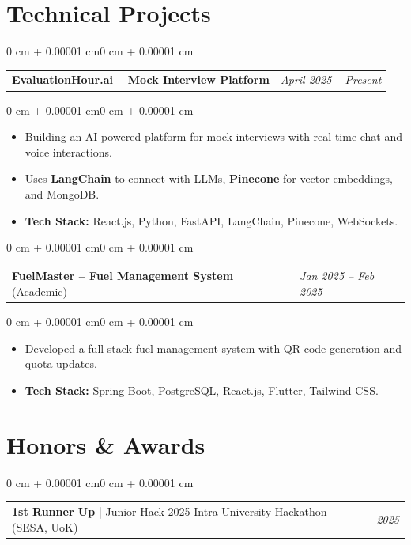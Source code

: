 \documentclass[10pt, letterpaper]{article}
\makeatletter
\newenvironment{highlights}{
    \begin{itemize}[
        topsep=0.10 cm,
        parsep=0.10 cm,
        partopsep=0pt,
        itemsep=0pt,
        leftmargin=0 cm + 10pt
    ]
}{
    \end{itemize}
}
\newenvironment{onecolentry}{
    \begin{adjustwidth}{0 cm + 0.00001 cm}{0 cm + 0.00001 cm}
}{
    \end{adjustwidth}
}
\newenvironment{twocolentry}{
    \begin{onecolentry}
    \begin{tabular}{@{}p{\dimexpr\textwidth-4.5cm\relax}>{\raggedleft\arraybackslash}p{4.5cm}@{}}
}{
    \end{tabular}
    \end{onecolentry}
}
\newcommand{\twocolitem}[2]{#1 & \textit{#2} \\}
\makeatother
\begin{document}
\section{Technical Projects}

\begin{twocolentry}
\twocolitem{\textbf{EvaluationHour.ai -- Mock Interview Platform}}{April 2025 -- Present}
\end{twocolentry}

\vspace{0.08 cm}
\begin{onecolentry}
    \begin{highlights}
        \item Building an AI-powered platform for mock interviews with real-time chat and voice interactions.
        \item Uses \textbf{LangChain} to connect with LLMs, \textbf{Pinecone} for vector embeddings, and MongoDB.
        \item \textbf{Tech Stack:} React.js, Python, FastAPI, LangChain, Pinecone, WebSockets.
    \end{highlights}
\end{onecolentry}

\vspace{0.18 cm}

\begin{twocolentry}
\twocolitem{\textbf{FuelMaster -- Fuel Management System} (Academic)}{Jan 2025 -- Feb 2025}
\end{twocolentry}

\vspace{0.08 cm}
\begin{onecolentry}
    \begin{highlights}
        \item Developed a full-stack fuel management system with QR code generation and quota updates.
        \item \textbf{Tech Stack:} Spring Boot, PostgreSQL, React.js, Flutter, Tailwind CSS.
    \end{highlights}
\end{onecolentry}

\section{Honors \& Awards}

\begin{twocolentry}
\twocolitem{\textbf{1st Runner Up} | Junior Hack 2025 Intra University Hackathon (SESA, UoK)}{2025}
\end{twocolentry}
\end{document}
